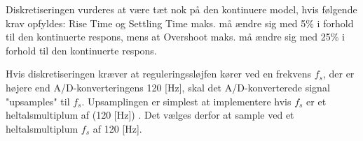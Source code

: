 Diskretiseringen vurderes at være tæt nok på den kontinuere model, hvis følgende krav opfyldes:
Rise Time og Settling Time maks. må ændre sig med 5\% i forhold
til den kontinuerte respons, mens at Overshoot maks. må ændre sig med 25\% i forhold til
den kontinuerte respons.


Hvis diskretiseringen kræver at reguleringssløjfen kører ved en frekvens \(f_s\),
der er højere end A/D-konverteringens 120 [Hz], skal det A/D-konverterede
signal "upsamples" til \(f_s\).
Upsamplingen er simplest at implementere
hvis \(f_s\) er et heltalsmultiplum af (120 [Hz]) \citep[s. 562]{dsp}.
Det vælges derfor at sample ved et heltalsmultiplum \(f_s\) af 120 [Hz].

